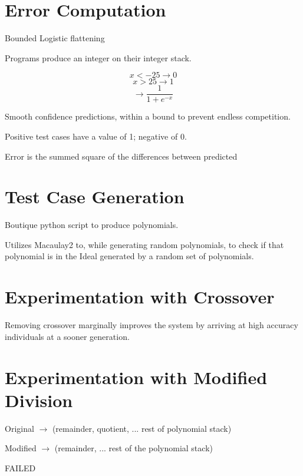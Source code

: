 \documentclass[20pt]{extarticle}
\begin{document}
% 


\newpage
\section*{Error Computation}

\noindent Bounded Logistic flattening

\noindent Programs produce an integer on their integer stack. 

 $$x < -25 \rightarrow 0 $$
 $$x > 25  \rightarrow 1 $$
 $$\rightarrow \frac{1}{1+e^{-x}}$$

Smooth confidence predictions, within a bound to prevent endless competition. 

Positive test cases have a value of 1; negative of 0.

Error is the summed square of the differences between predicted 
\newpage
\section*{Test Case Generation}

Boutique python script to produce polynomials. 

Utilizes Macaulay2 to, while generating random polynomials, to check if that polynomial is in the Ideal generated by a random set of polynomials.

\newpage
\section*{Experimentation with Crossover}

Removing crossover marginally improves the system by arriving at high accuracy individuals at a sooner generation.

\newpage
\section*{Experimentation with Modified Division}

Original $\rightarrow$ (remainder, quotient, ... rest of polynomial stack)

Modified $\rightarrow$ (remainder, ... rest of the polynomial stack)

FAILED
\end{document}
